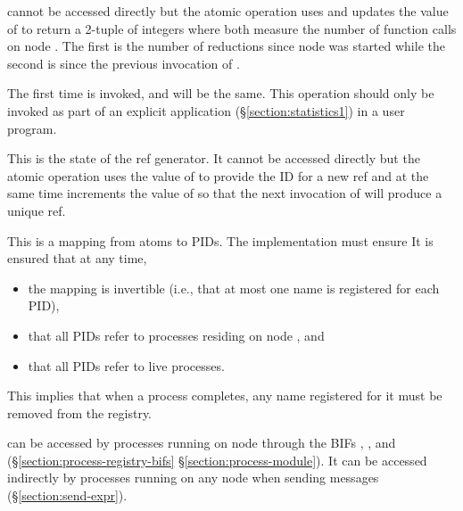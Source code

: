 \begin{Lentry}
 cannot be accessed directly but the atomic operation
 uses and updates the value of 
to return a 2-tuple  of integers where both
measure the number of function calls on node .
The first is the number of reductions since node  was started while the second is
since the previous invocation of .

The first time  is invoked,
 and  will be the same.
This operation should only be invoked as part of an explicit
application  (\S\ref{section:statistics1}) in a user program.

\item[\T{ref_state[\Z{N}]}]
This is the state of the ref generator.  It cannot be accessed directly
but the atomic operation  uses the value of 
to provide the ID for a new ref and at the same time increments the value of
so that the next invocation of  will produce a unique ref.

\item[\T{registry[\Z{N}]}]
This is a mapping from atoms to PIDs.
\ifStd The implementation must ensure \fi
\ifOld It is ensured \fi
that at any time,
\begin{itemize}
\item the mapping is invertible (i.e., that at most one name is registered
for each PID),
\item that all PIDs refer to processes residing on node , and
\item that all PIDs refer to live processes.
\end{itemize}
This implies that when a process completes, any name registered for it
must be removed from the registry.

 can be accessed
by processes running on node  through the BIFs , ,
 and 
(\ifOld\S\ref{section:process-registry-bifs}\fi
\ifStd\S\ref{section:process-module}\fi).
It can be accessed indirectly by processes running
on any node when sending messages (\S\ref{section:send-expr}).


\end{Lentry}
